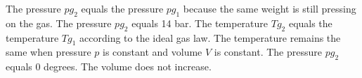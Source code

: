 The pressure \( p g_2 \) equals the pressure \( p g_1 \) because the same weight is still pressing on the gas.
The pressure \( p g_2 \) equals 14 bar.
The temperature \( T g_2 \) equals the temperature \( T g_1 \) according to the ideal gas law.
The temperature remains the same when pressure \( p \) is constant and volume \( V \) is constant.
The pressure \( p g_2 \) equals 0 degrees.
The volume does not increase.
